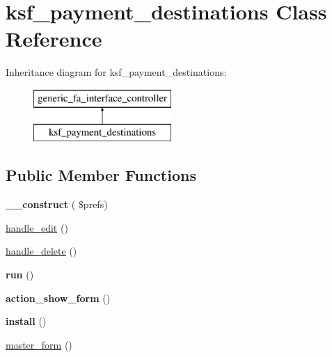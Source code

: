 \hypertarget{classksf__payment__destinations}{}\section{ksf\+\_\+payment\+\_\+destinations Class Reference}
\label{classksf__payment__destinations}
Inheritance diagram for ksf\+\_\+payment\+\_\+destinations\+:\begin{figure}[H]
\begin{center}
\leavevmode
\includegraphics[height=2.000000cm]{d8/dc2/classksf__payment__destinations}
\end{center}
\end{figure}
\subsection*{Public Member Functions}
\begin{DoxyCompactItemize}
\item 
\hypertarget{classksf__payment__destinations_a3bce51ae77abebb9531554d5d6271de0}{}\label{classksf__payment__destinations_a3bce51ae77abebb9531554d5d6271de0} 
{\bfseries \+\_\+\+\_\+construct} ( \$prefs)
\item 
\hyperlink{classksf__payment__destinations_a7078c43829c1b6a6222e2930d99d0608}{handle\+\_\+edit} ()
\item 
\hyperlink{classksf__payment__destinations_a617a0cadddf6ade17f478e8476449871}{handle\+\_\+delete} ()
\item 
\hypertarget{classksf__payment__destinations_a8e3f5cc97e550f8fe1b02da3fdbf9294}{}\label{classksf__payment__destinations_a8e3f5cc97e550f8fe1b02da3fdbf9294} 
{\bfseries run} ()
\item 
\hypertarget{classksf__payment__destinations_a1e8e91ebcf8beeb203bcaf284022a586}{}\label{classksf__payment__destinations_a1e8e91ebcf8beeb203bcaf284022a586} 
{\bfseries action\+\_\+show\+\_\+form} ()
\item 
\hypertarget{classksf__payment__destinations_aa5c9b70c9fc3a4fa2909ad199303c353}{}\label{classksf__payment__destinations_aa5c9b70c9fc3a4fa2909ad199303c353} 
{\bfseries install} ()
\item 
\hyperlink{classksf__payment__destinations_af957fcc97c11896268883359ff45ddd4}{master\+\_\+form} ()
\end{DoxyCompactItemize}
